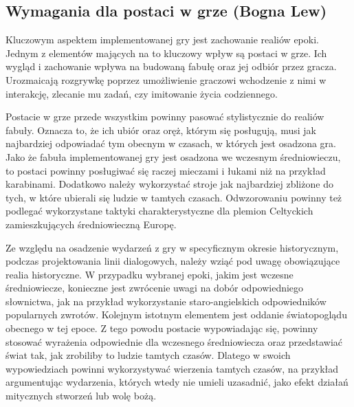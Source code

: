 \subsection{Wymagania dla postaci w grze (Bogna Lew)}
Kluczowym aspektem implementowanej gry jest zachowanie realiów epoki. Jednym z elementów mających na to kluczowy wpływ
są postaci w grze. Ich wygląd i zachowanie wpływa na budowaną fabułę oraz jej odbiór przez gracza. Urozmaicają rozgrywkę
poprzez umożliwienie graczowi wchodzenie z nimi w interakcję, zlecanie mu zadań, czy imitowanie życia codziennego.

Postacie w grze przede wszystkim powinny pasować stylistycznie do realiów fabuły. Oznacza to, że ich ubiór oraz oręż,
którym się posługują, musi jak najbardziej odpowiadać tym obecnym w czasach, w których jest osadzona gra. Jako że
fabuła implementowanej gry jest osadzona we wczesnym średniowieczu, to postaci powinny posługiwać się raczej mieczami i
łukami niż na przykład karabinami. Dodatkowo należy wykorzystać stroje jak najbardziej zbliżone do tych, w które ubierali
się ludzie w tamtych czasach. Odwzorowaniu powinny też podlegać wykorzystane taktyki charakterystyczne dla plemion Celtyckich zamieszkujących średniowieczną Europę.

Ze względu na osadzenie wydarzeń z gry w specyficznym okresie historycznym,
podczas projektowania linii dialogowych, należy wziąć pod uwagę obowiązujące realia historyczne.
W przypadku wybranej epoki, jakim jest wczesne średniowiecze, konieczne jest zwrócenie uwagi
na dobór odpowiedniego słownictwa, jak na przykład wykorzystanie staro-angielskich odpowiedników
popularnych zwrotów. Kolejnym istotnym elementem jest oddanie światopoglądu obecnego w tej epoce. Z tego powodu postacie wypowiadając się,
powinny stosować wyrażenia odpowiednie dla wczesnego średniowiecza oraz przedstawiać świat tak, jak zrobiliby to
ludzie tamtych czasów. Dlatego w swoich wypowiedziach powinni wykorzystywać wierzenia tamtych czasów, na przykład
argumentując wydarzenia, których wtedy nie umieli uzasadnić, jako efekt działań mitycznych stworzeń lub wolę bożą.

